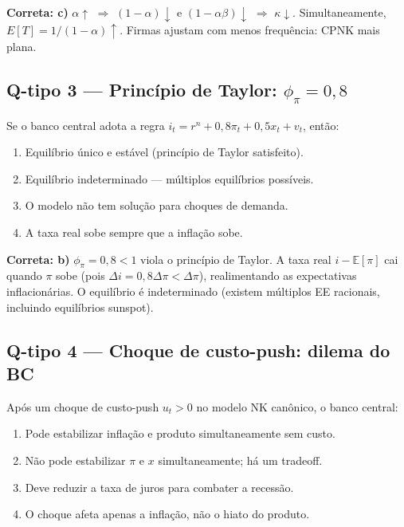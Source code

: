 \documentclass[12pt, a4paper]{article}
\newcommand{\E}{\mathbb{E}}
\begin{document}
\begin{resultbox}[title={Resposta Q-tipo 2: alternativa c)}]
\textbf{Correta: c)} $\alpha\uparrow$ $\Rightarrow$ $(1-\alpha)\downarrow$ e $(1-\alpha\beta)\downarrow$
$\Rightarrow$ $\kappa\downarrow$. Simultaneamente, $E[T] = 1/(1-\alpha)\uparrow$.
Firmas ajustam com menos frequência: CPNK mais plana.
\end{resultbox}

\bigskip

\subsection*{Q-tipo 3 --- Princípio de Taylor: $\phi_\pi = 0{,}8$}

Se o banco central adota a regra $i_t = r^n + 0{,}8\pi_t + 0{,}5x_t + v_t$, então:

\begin{enumerate}[label=\textbf{\alph*)}, leftmargin=2em, itemsep=4pt]
  \item Equilíbrio único e estável (princípio de Taylor satisfeito).
  \item Equilíbrio indeterminado --- múltiplos equilíbrios possíveis.
  \item O modelo não tem solução para choques de demanda.
  \item A taxa real sobe sempre que a inflação sobe.
\end{enumerate}

\begin{resultbox}[title={Resposta Q-tipo 3: alternativa b)}]
\textbf{Correta: b)} $\phi_\pi = 0{,}8 < 1$ viola o princípio de Taylor. A taxa real
$i - \E[\pi]$ cai quando $\pi$ sobe (pois $\Delta i = 0{,}8\Delta\pi < \Delta\pi$),
realimentando as expectativas inflacionárias. O equilíbrio é indeterminado
(existem múltiplos EE racionais, incluindo equilíbrios sunspot).
\end{resultbox}

\bigskip

\subsection*{Q-tipo 4 --- Choque de custo-push: dilema do BC}

Após um choque de custo-push $u_t > 0$ no modelo NK canônico, o banco central:

\begin{enumerate}[label=\textbf{\alph*)}, leftmargin=2em, itemsep=4pt]
  \item Pode estabilizar inflação e produto simultaneamente sem custo.
  \item Não pode estabilizar $\pi$ e $x$ simultaneamente; há um tradeoff.
  \item Deve reduzir a taxa de juros para combater a recessão.
  \item O choque afeta apenas a inflação, não o hiato do produto.
\end{enumerate}
\end{document}
